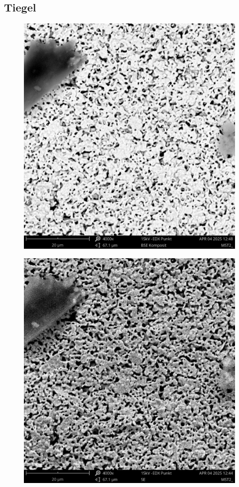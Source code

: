 \subsection{Tiegel}
    \begin{figure}[H]
        \centering
        \begin{minipage}{.5\textwidth}
          \centering
          \includegraphics[width=.9\linewidth]{Bilder/MST2_0029}
          \label{Abb.2: REM-Aufnahme(BSE Komposit, 4000x) des Tiegels mit Punktanalyse}
        \end{minipage}%
        \begin{minipage}{.5\textwidth}
          \centering
          \includegraphics[width=.9\linewidth]{Bilder/MST2_0026}

\end{minipage}
\end{figure}
